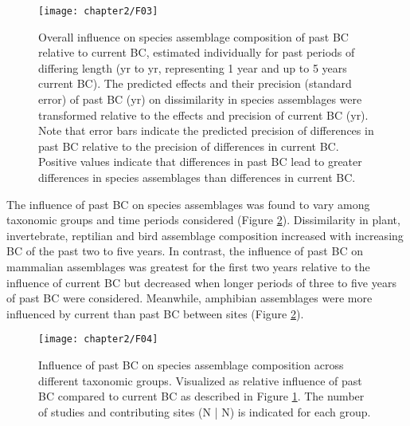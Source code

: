 \begin{figure}[ht]
\centering
\texttt{[image: chapter2/F03]}
\caption{Overall influence on species assemblage composition of past BC relative to current BC, estimated individually for past periods of differing length (yr to yr, representing 1 year and up to 5 years current BC). The predicted effects and their precision (standard error) of past BC (yr) on dissimilarity in species assemblages were transformed relative to the effects and precision of current BC (yr). Note that error bars indicate the predicted precision of differences in past BC relative to the precision of differences in current BC. Positive values indicate that differences in past BC lead to greater differences in species assemblages than differences in current BC.}
\label{F02_03}
\end{figure}
The influence of past BC on species assemblages was found to vary among taxonomic groups and time periods considered (Figure \ref{F02_04}). Dissimilarity in plant, invertebrate, reptilian and bird assemblage composition increased with increasing BC of the past two to five years. In contrast, the influence of past BC on mammalian assemblages was greatest for the first two years relative to the influence of current BC but decreased when longer periods of three to five years of past BC were considered. Meanwhile, amphibian assemblages were more influenced by current than past BC between sites (Figure \ref{F02_04}).
\begin{figure}[ht]
\centering
\texttt{[image: chapter2/F04]}
\caption{Influence of past BC on species assemblage composition across different taxonomic groups. Visualized as relative influence of past BC compared to current BC as described in Figure \ref{F02_03}. The number of studies and contributing sites (N | N) is indicated for each group.}
\label{F02_04}
\end{figure}
